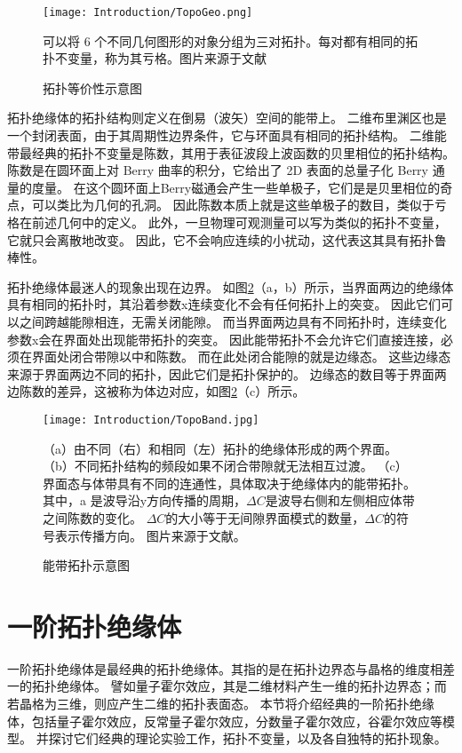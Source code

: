 \begin{figure}[htbp]
	\centering
	\texttt{[image: Introduction/TopoGeo.png]}
 \caption{拓扑等价性示意图}可以将 6 个不同几何图形的对象分组为三对拓扑。每对都有相同的拓扑不变量，称为其亏格。图片来源于文献\cite{lu2014topological}
 \label{fig:TopoGeo}
\end{figure}

拓扑绝缘体的拓扑结构则定义在倒易（波矢）空间的能带上。
二维布里渊区也是一个封闭表面，由于其周期性边界条件，它与环面具有相同的拓扑结构。
二维能带最经典的拓扑不变量是陈数，其用于表征波段上波函数的贝里相位的拓扑结构。
陈数是在圆环面上对 Berry 曲率的积分，它给出了 2D 表面的总量子化 Berry 通量的度量。
在这个圆环面上Berry磁通会产生一些单极子，它们是是贝里相位的奇点，可以类比为几何的孔洞。
因此陈数本质上就是这些单极子的数目，类似于亏格在前述几何中的定义。
此外，一旦物理可观测量可以写为类似的拓扑不变量，它就只会离散地改变。
因此，它不会响应连续的小扰动，这代表这其具有拓扑鲁棒性。

拓扑绝缘体最迷人的现象出现在边界。
如图\ref{fig:TopoBand}（a，b）所示，当界面两边的绝缘体具有相同的拓扑时，其沿着参数x连续变化不会有任何拓扑上的突变。
因此它们可以之间跨越能隙相连，无需关闭能隙。
而当界面两边具有不同拓扑时，连续变化参数x会在界面处出现能带拓扑的突变。
因此能带拓扑不会允许它们直接连接，必须在界面处闭合带隙以中和陈数。
而在此处闭合能隙的就是边缘态。
这些边缘态来源于界面两边不同的拓扑，因此它们是拓扑保护的。
边缘态的数目等于界面两边陈数的差异，这被称为体边对应，如图\ref{fig:TopoBand}（c）所示。
\begin{figure}[htbp]
	\centering
	\texttt{[image: Introduction/TopoBand.jpg]}
 \caption{能带拓扑示意图}
 （a）由不同（右）和相同（左）拓扑的绝缘体形成的两个界面。
（b）不同拓扑结构的频段如果不闭合带隙就无法相互过渡。
（c）界面态与体带具有不同的连通性，具体取决于绝缘体内的能带拓扑。
 其中，a 是波导沿y方向传播的周期，$\Delta C$是波导右侧和左侧相应体带之间陈数的变化。
 $\Delta C$的大小等于无间隙界面模式的数量，$\Delta C$的符号表示传播方向。
图片来源于文献\cite{lu2014topological}。
 \label{fig:TopoBand}
\end{figure}

\section{一阶拓扑绝缘体}
一阶拓扑绝缘体是最经典的拓扑绝缘体。其指的是在拓扑边界态与晶格的维度相差一的拓扑绝缘体。
譬如量子霍尔效应，其是二维材料产生一维的拓扑边界态；而若晶格为三维，则应产生二维的拓扑表面态。
本节将介绍经典的一阶拓扑绝缘体，包括量子霍尔效应，反常量子霍尔效应，分数量子霍尔效应，谷霍尔效应等模型。
并探讨它们经典的理论实验工作，拓扑不变量，以及各自独特的拓扑现象。

